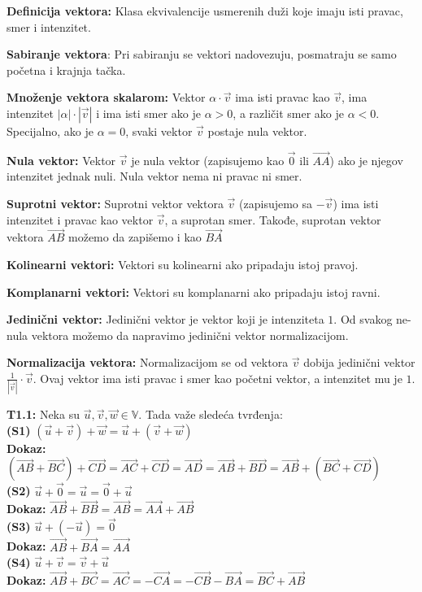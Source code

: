 \documentclass[12pt]{article}
\newcommand{\vek}[1]{\overrightarrow{#1}}
\begin{document}
\textbf{Definicija vektora:} Klasa ekvivalencije usmerenih duži koje imaju isti
pravac, smer i intenzitet.
\par

\textbf{Sabiranje vektora}: Pri sabiranju se vektori nadovezuju, posmatraju se
samo početna i krajnja tačka.
\par

\textbf{Množenje vektora skalarom:} Vektor $\alpha\cdot\vek{v}$ ima isti pravac
kao $\vek{v}$, ima intenzitet $|\alpha|\cdot|\vek{v}|$ i ima isti smer ako je
$\alpha>0$, a različit smer ako je $\alpha<0$. Specijalno, ako je $\alpha=0$,
svaki vektor $\vek{v}$ postaje nula vektor.
\par

\textbf{Nula vektor:} Vektor $\vek{v}$ je nula vektor (zapisujemo kao $\vek{0}$
ili $\vek{AA}$) ako je njegov intenzitet jednak nuli. Nula vektor nema ni
pravac ni smer.
\par

\textbf{Suprotni vektor:} Suprotni vektor vektora $\vek{v}$ (zapisujemo sa
$-\vek{v}$) ima isti intenzitet i pravac kao vektor $\vek{v}$, a suprotan smer.
Takođe, suprotan vektor vektora $\vek{AB}$ možemo da zapišemo i kao $\vek{BA}$
\par

\textbf{Kolinearni vektori:} Vektori su kolinearni ako pripadaju istoj pravoj.
\par

\textbf{Komplanarni vektori:} Vektori su komplanarni ako pripadaju istoj ravni.
\par

\textbf{Jedinični vektor:} Jedinični vektor je vektor koji je intenziteta $1$.
Od svakog ne-nula vektora možemo da napravimo jedinični vektor normalizacijom.
\par

\textbf{Normalizacija vektora:} Normalizacijom se od vektora $\vek{v}$ dobija
jedinični vektor $\frac{1}{|\vek{v}|}\cdot\vek{v}$. Ovaj vektor ima isti pravac
i smer kao početni vektor, a intenzitet mu je $1$.
\par

\textbf{T1.1:} Neka su $\vek{u}, \vek{v}, \vek{w}\in\mathbb{V}$. Tada važe
sledeća tvrđenja:\\
\textbf{(S1)}
$(\vek{u}+\vek{v})+\vek{w}=\vek{u}+(\vek{v}+\vek{w})$\\
\textbf{Dokaz:}
$(\vek{AB}+\vek{BC})+\vek{CD}=\vek{AC}+\vek{CD}=\vek{AD}=\vek{AB}+\vek{BD}
    =\vek{AB}+(\vek{BC}+\vek{CD})$\\
\textbf{(S2)}
$\vek{u}+\vek{0}=\vek{u}=\vek{0}+\vek{u}$\\
\textbf{Dokaz:}
$\vek{AB}+\vek{BB}=\vek{AB}=\vek{AA}+\vek{AB}$\\
\textbf{(S3)}
$\vek{u}+(-\vek{u})=\vek{0}$\\
\textbf{Dokaz:}
$\vek{AB}+\vek{BA}=\vek{AA}$\\
\textbf{(S4)}
$\vek{u}+\vek{v}=\vek{v}+\vek{u}$\\
\textbf{Dokaz:}
$\vek{AB}+\vek{BC}=\vek{AC}=-\vek{CA}=-\vek{CB}-\vek{BA}=\vek{BC}+\vek{AB}$
\end{document}
